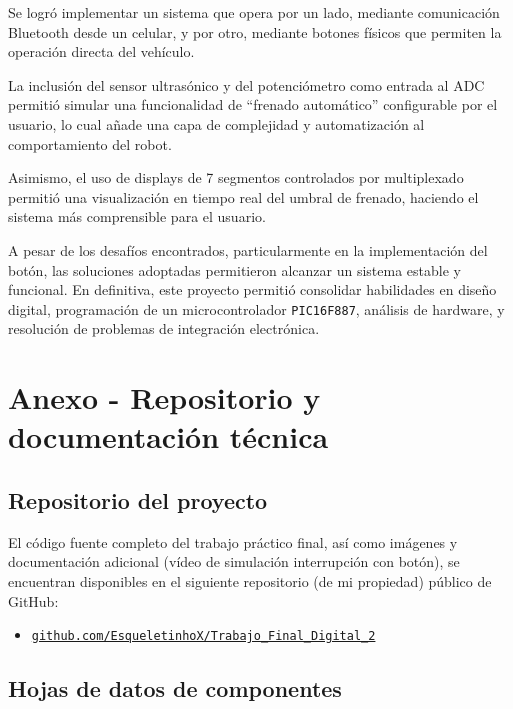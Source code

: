 \documentclass[]{article}
\begin{document}
	Se logró implementar un sistema que opera por un lado, mediante comunicación Bluetooth desde un celular, y por otro, mediante botones físicos que permiten la operación directa del vehículo.
	
	La inclusión del sensor ultrasónico y del potenciómetro como entrada al ADC permitió simular una funcionalidad de “frenado automático” configurable por el usuario, lo cual añade una capa de complejidad y automatización al comportamiento del robot. 
	
	Asimismo, el uso de displays de 7 segmentos controlados por multiplexado permitió una visualización en tiempo real del umbral de frenado, haciendo el sistema más comprensible para el usuario.
	
	\newpage
	\thispagestyle{fancy}
	
	A pesar de los desafíos encontrados, particularmente en la implementación del botón, las soluciones adoptadas permitieron alcanzar un sistema estable y funcional. En definitiva, este proyecto permitió consolidar habilidades en diseño digital, programación de un microcontrolador \texttt{PIC16F887}, análisis de hardware, y resolución de problemas de integración electrónica.
	
	\newpage
	\appendix
	\section{Anexo - Repositorio y documentación técnica}
	
	\subsection{Repositorio del proyecto}
	
	El código fuente completo del trabajo práctico final, así como imágenes y documentación adicional (vídeo de simulación interrupción con botón), se encuentran disponibles en el siguiente repositorio (de mi propiedad) público de GitHub:
	
	\begin{itemize}
		\item \href{https://github.com/EsqueletinhoX/Trabajo_Final_Digital_2/tree/main}{\texttt{github.com/EsqueletinhoX/Trabajo\_Final\_Digital\_2}}
	\end{itemize}
	
	\vspace{1cm}
	
	\subsection{Hojas de datos de componentes}
	
\end{document}
